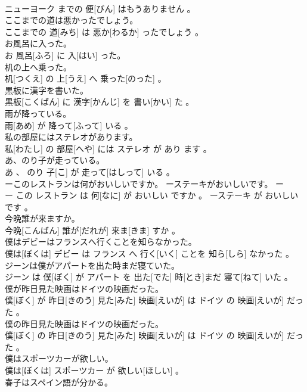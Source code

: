 \documentclass[8pt]{extreport}
\begin{document}
\begin{CJK}{UTF8}{min}
\\	ニューヨーク までの 便[びん] はもうありません 。
\\	ここまでの道は悪かったでしょう。	
\\	ここまでの 道[みち] は 悪か[わるか] ったでしょう 。
\\	お風呂に入った。	
\\	お 風呂[ふろ] に 入[はい] った。
\\	机の上へ乗った。	
\\	机[つくえ] の 上[うえ] へ 乗った[のった] 。
\\	黒板に漢字を書いた。	
\\	黒板[こくばん] に 漢字[かんじ] を 書い[かい] た 。
\\	雨が降っている。	
\\	雨[あめ] が 降って[ふって] いる 。
\\	私の部屋にはステレオがあります。	
\\	私[わたし] の 部屋[へや] には ステレオ が あり ます 。
\\	あ、のり子が走っている。	
\\	あ 、 のり 子[こ] が 走って[はしって] いる 。
\\	ーこのレストランは何がおいしいですか。 ーステーキがおいしいです。	ー
\\	ー この レストラン は 何[なに] が おいしい ですか 。 ーステーキ が おいしい です 。
\\	今晩誰が来ますか。	
\\	今晩[こんばん] 誰が[だれが] 来ま[きま] すか 。
\\	僕はデビーはフランスへ行くことを知らなかった。	
\\	僕は[ぼくは] デビー は フランス へ 行く[いく] ことを 知ら[しら] なかった 。
\\	ジーンは僕がアパートを出た時まだ寝ていた。	
\\	ジーン は 僕[ぼく] が アパート を 出た[でた] 時[とき]まだ 寝て[ねて] いた 。
\\	僕が昨日見た映画はドイツの映画だった。	
\\	僕[ぼく] が 昨日[きのう] 見た[みた] 映画[えいが] は ドイツ の 映画[えいが] だった 。
\\	僕の昨日見た映画はドイツの映画だった。	
\\	僕[ぼく] の 昨日[きのう] 見た[みた] 映画[えいが] は ドイツ の 映画[えいが] だった 。
\\	僕はスポーツカーが欲しい。	
\\	僕は[ぼくは] スポーツカー が 欲しい[ほしい] 。
\\	春子はスペイン語が分かる。	

\end{CJK}
\end{document}
